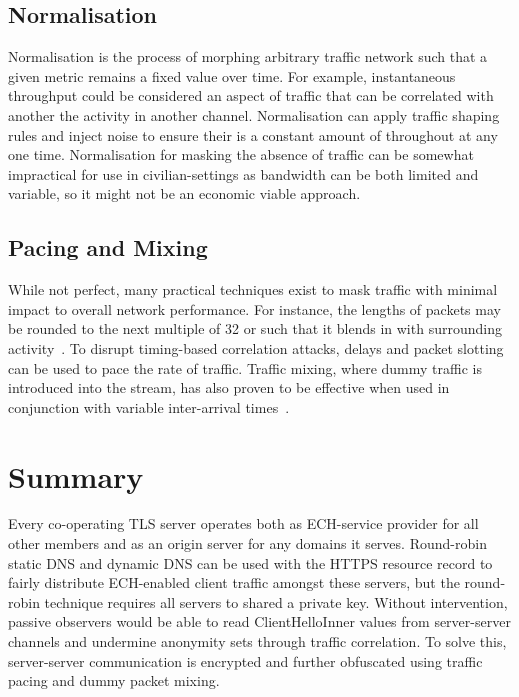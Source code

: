 \subsection{Normalisation}

Normalisation is the process of morphing arbitrary traffic network such that a given metric remains a fixed value over time. For example, instantaneous throughput could be considered an aspect of traffic that can be correlated with another the activity in another channel. Normalisation can apply traffic shaping rules and inject noise to ensure their is a constant amount of throughout at any one time. Normalisation for masking the absence of traffic can be somewhat impractical for use in civilian-settings as bandwidth can be both limited and variable, so it might not be an economic viable approach.

\subsection{Pacing and Mixing}

While not perfect, many practical techniques exist to mask traffic with minimal impact to overall network performance. For instance, the lengths of packets may be rounded to the next multiple of 32 or such that it blends in with surrounding activity~\cite{yu2012predicted}. To disrupt timing-based correlation attacks, delays and packet slotting can be used to pace the rate of traffic. Traffic mixing, where dummy traffic is introduced into the stream, has also proven to be effective when used in conjunction with variable inter-arrival times~\cite{fu2003analytical, fu2003effectiveness}.






\section{Summary}

Every co-operating TLS server operates both as ECH-service provider for all other members and as an origin server for any domains it serves. Round-robin static DNS and dynamic DNS can be used with the HTTPS resource record to fairly distribute ECH-enabled client traffic amongst these servers, but the round-robin technique requires all servers to shared a private key. Without intervention, passive observers would be able to read ClientHelloInner values from server-server channels and undermine anonymity sets through traffic correlation. To solve this, server-server communication is encrypted and further obfuscated using traffic pacing and dummy packet mixing.
